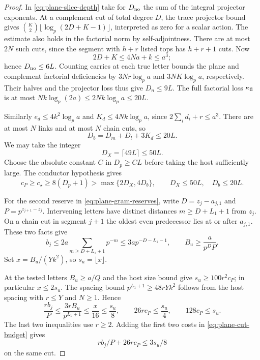 \begin{proof}
In \eqref{eq:plane-slice-depth} take for \(D_{\rm no}\) the sum of
the integral projector exponents. At a complement cut of total
degree \(D\), the trace projector bound gives
\(\binom K2\lfloor\log_p(2D+K-1)\rfloor\), interpreted as zero
for a scalar action. The estimate also holds in the factorial
norm by self-adjointness. There are at most \(2N\) such cuts,
since the segment with \(h+r\) listed tops has \(h+r+1\) cuts.
Now
\[
 2D+K\le4Na+k\le a^3;
\]
hence \(D_{\rm no}\le6L\).
Counting carries at each true letter bounds the plane and
complement factorial deficiencies by \(3Nr\log_p a\) and
\(3NK\log_p a\), respectively. Their halves and the
projector loss thus give \(D_n\le9L\).
The full factorial loss \(\kappa_{\rm fl}\) is at most
\(Nk\log_p(2a)\le 2Nk\log_p a\le20L\).

Similarly \(e_d\le4k^2\log_p a\) and
\(K_d\le4Nk\log_p a\), since \(2\sum_i d_i+r\le a^3\).
There are at most \(N\) links and at most \(N\) chain cuts,
so \[
 D_b=D_m+D_l+3K_d\le20L.
\] We may take the integer
\[
                         D_X=\lceil49L\rceil\le50L .
\]
Choose the absolute constant \(C\) in \(D_p\ge CL\) before
taking the host sufficiently large. The conductor hypothesis gives
\[
 c_P\ge c_\star\ge8(D_p+1)>\max\{2D_X,4D_b\},
 \qquad D_X\le50L,\quad D_b\le20L .
\]

For the second reserve in \eqref{eq:plane-gram-reserves}, write
\(D=z_j-a_{j,1}\) and \(P=p^{z_{j+1}-z_j}\). Intervening letters
have distinct distances \(m\ge D+L_1+1\) from \(z_j\).
On a chain cut in segment \(j+1\) the oldest even predecessor
lies at or after \(a_{j,1}\). These two facts give
\[
 b_j\le 2a\sum_{m\ge D+L_1+1}p^{-m}
     \le 3a p^{-D-L_1-1},
 \qquad B_u\ge \frac{a}{p^D P}.
\]
Set \(x=B_u/(Yk^2)\), so \(s_u=\lfloor x\rfloor\).

At the tested letters \(B_u\ge a/Q\) and the host size bound
give \(s_u\ge100r^2 c_P\); in particular \(x\le2s_u\).
The spacing bound \(p^{L_1+1}\ge48rYk^2\) follows from the
host spacing with \(r\le Y\) and \(N\ge1\). Hence
\begin{equation}\label{eq:plane-cut-budget}
 \frac{rb_j}{P}\le \frac{3rB_u}{p^{L_1+1}}
       \le\frac{x}{16}\le\frac{s_u}{8},\qquad
 26r c_P\le\frac{s_u}{4},\qquad 128c_P\le s_u .
\end{equation}
The last two inequalities use \(r\ge2\). Adding the first two costs in \eqref{eq:plane-cut-budget} gives
\[
 rb_j/P+26r c_P\le3s_u/8
\]
on the same cut.


\end{proof}

